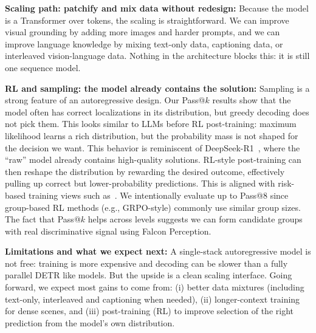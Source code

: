 \noindent\textbf{Scaling path: patchify and mix data without redesign:}
Because the model is a Transformer over tokens, the scaling is straightforward. We can improve visual grounding by adding more images and harder prompts, and we can improve language knowledge by mixing text-only data, captioning data, or interleaved vision-language data. Nothing in the architecture blocks this: it is still one sequence model. 

\noindent\textbf{RL and sampling: the model already contains the solution:}
Sampling is a strong feature of an autoregressive design. Our Pass@$k$ results show that the model often has correct localizations in its distribution, but greedy decoding does not pick them. This looks similar to LLMs before RL post-training: maximum likelihood learns a rich distribution, but the probability mass is not shaped for the decision we want. This behavior is reminiscent of DeepSeek-R1~\citep{guo2025deepseek}, where the ``raw'' model already contains high-quality solutions. RL-style post-training can then reshape the distribution by rewarding the desired outcome, effectively pulling up correct but lower-probability predictions. This is aligned with risk-based training views such as~\citep{pinto2023tuning}. We intentionally evaluate up to Pass@$8$ since group-based RL methods (e.g., GRPO-style) commonly use similar group sizes. The fact that Pass@$k$ helps across levels suggests we can form candidate groups with real discriminative signal using Falcon Perception.

\noindent\textbf{Limitations and what we expect next:}
A single-stack autoregressive model is not free: training is more expensive and decoding can be slower than a fully parallel DETR like models. But the upside is a clean scaling interface. Going forward, we expect most gains to come from: (i) better data mixtures (including text-only, interleaved and captioning when needed), (ii) longer-context training for dense scenes, and (iii) post-training (RL) to improve selection of the right prediction from the model's own distribution.
